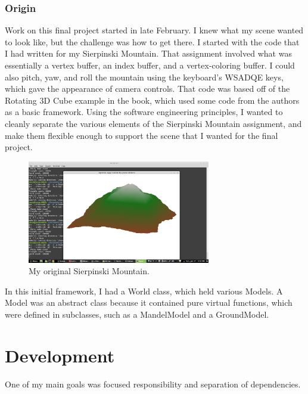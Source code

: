 \documentclass[journal]{IEEEtran}
\begin{document}
\subsubsection{Origin}

Work on this final project started in late February. I knew what my scene wanted to look like, but the challenge was how to get there. I started with the code that I had written for my Sierpinski Mountain. That assignment involved what was essentially a vertex buffer, an index buffer, and a vertex-coloring buffer. I could also pitch, yaw, and roll the mountain using the keyboard's WSADQE keys, which gave the appearance of camera controls. That code was based off of the Rotating 3D Cube example in the book, which used some code from the authors as a basic framework. Using the software engineering principles, I wanted to cleanly separate the various elements of the Sierpinski Mountain assignment, and make them flexible enough to support the scene that I wanted for the final project.

\begin{figure}[htbp]
\centering
\fbox
{
	\begin{minipage}{8 cm}
		\includegraphics[width=80mm]{resources/Sierpinski_Mountain.jpg}
		\caption{My original Sierpinski Mountain.}
	\end{minipage}
}
\end{figure}

In this initial framework, I had a World class, which held various Models. A Model was an abstract class because it contained pure virtual functions, which were defined in subclasses, such as a MandelModel and a GroundModel.

\section{Development}

One of my main goals was focused responsibility and separation of dependencies.
\end{document}

